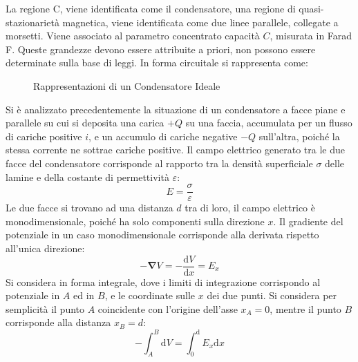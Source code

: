 \documentclass{article}
\newcommand{\vect}[1]{\boldsymbol{\mathbf{#1}}}
\newcommand{\df}{\mathrm{d}}
\numberwithin{equation}{subsection}
\begin{document}
La regione C, viene identificata come il condensatore, una regione di quasi-stazionarietà magnetica, viene identificata come due linee parallele, collegate a morsetti. Viene 
associato al parametro concentrato capacità $C$, misurata in Farad F. Queste grandezze devono essere attribuite a priori, non possono essere determinate sulla base di leggi. 
In forma circuitale si rappresenta come:
\begin{figure}[H]%
    \centering
    \qquad
    \caption{Rappresentazioni di un Condensatore Ideale}
    \label{fig:rappresentazione-condensatore}
\end{figure}


Si è analizzato precedentemente la situazione di un condensatore a facce piane e parallele su cui si deposita una carica $+Q$ su una faccia, accumulata per un flusso di 
cariche positive $i$, e un accumulo di cariche negative $-Q$ sull'altra, poiché la stessa corrente ne sottrae cariche positive. Il campo elettrico generato tra le due 
facce del condensatore corrisponde al rapporto tra la densità superficiale $\sigma$ delle lamine e della costante di permettività $\varepsilon$:
\begin{equation*}
    E=\displaystyle\frac{\sigma}{\varepsilon}
\end{equation*}
Le due facce si trovano ad una distanza $d$ tra di loro, il campo elettrico è monodimensionale, poiché ha solo componenti sulla direzione $x$. Il gradiente del potenziale 
in un caso monodimensionale corrisponde alla derivata rispetto all'unica direzione:
\begin{equation*}
    -\vect\nabla V=-\displaystyle\frac{\df V}{\df  x}=E_x
\end{equation*}
Si considera in forma integrale, dove i limiti di integrazione corrispondo al potenziale in $A$ ed in $B$, e le coordinate sulle $x$ dei due punti. Si considera per semplicità 
il punto $A$ coincidente con l'origine dell'asse $x_A=0$, mentre il punto $B$ corrisponde alla distanza $x_B=d$:
\begin{equation*}
    -\displaystyle\int_{A}^B\df V=\int_0^\df E_x\df x
\end{equation*}
\end{document}
